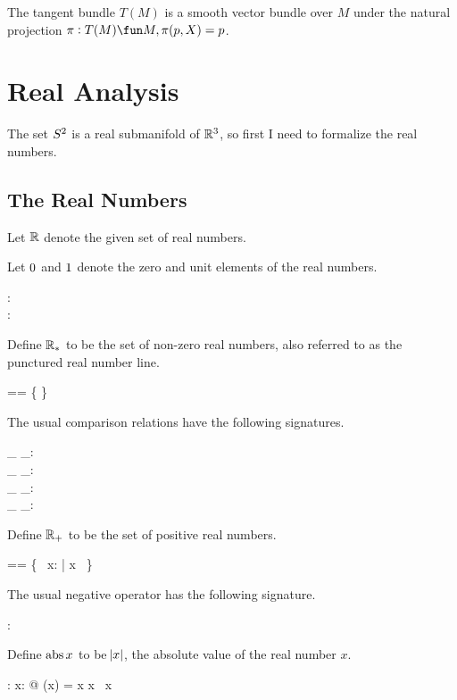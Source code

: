 \documentclass[11pt, oneside]{article}
\begin{document}
The tangent bundle $T(M)$ is a smooth vector bundle over $M$ under the natural projection
$\pi: T(M) \fun M, \pi(p,X) = p$.

\section{Real Analysis}

The set $S^2$ is a real submanifold of $\mathbb{R}^3$, so first I need to formalize the real numbers.

\subsection{The Real Numbers}

Let $\mathbb{R}$ denote the given set of real numbers.
\begin{zed}
	[\R]
\end{zed}

Let $0$ and $1$ denote the zero and unit elements of the real numbers.
\begin{axdef}
	\zeroR: \R \\
	\oneR: \R
\end{axdef}

Define $\mathbb{R}_{*}$ to be the set of non-zero real numbers, 
also referred to as the punctured real number line.
\begin{zed}
	\Rnz == \R \setminus \{ \zeroR \}
\end{zed}

The usual comparison relations have the following signatures.
\begin{axdef}
	\_ \ltR \_: \R \rel \R \\
	\_ \leR \_: \R \rel \R \\
	\_ \gtR \_: \R \rel \R \\
	\_ \geR \_: \R \rel \R
\end{axdef}

Define $\mathbb{R}_{+}$ to be the set of positive real numbers.
\begin{zed}
	\Rpos == \{~ x: \R | x \gtR \zeroR ~\}
\end{zed}

The usual negative operator has the following signature.
\begin{axdef}
	\negR: \R \fun \R
\end{axdef}

Define $\operatorname{abs}{x}$ to be $\abs{x}$, the absolute value of the real number $x$.
\begin{axdef}
	\absR: \R \fun \R
\where
	\forall x: \R @ \absR(x) = \IF x \geR \zeroR \THEN x \ELSE \negR~x
\end{axdef}
\end{document}
